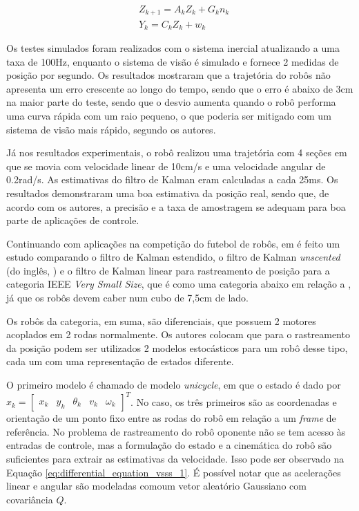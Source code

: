 \documentclass[acronym, symbols, table]{fei}
\begin{document}
	\begin{equation}\label{eq:kf_mult_rate}
		\begin{split}
			&Z_{k+1} = A_kZ_k + G_kn_k \\
			&Y_k = C_kZ_k + w_k
		\end{split}
	\end{equation}
	
	Os testes simulados foram realizados com o sistema inercial atualizando a uma taxa de 100Hz, enquanto o sistema de visão é simulado e fornece 2 medidas de posição por segundo. Os resultados mostraram que a trajetória do robôs não apresenta um erro crescente ao longo do tempo, sendo que o erro é abaixo de 3cm na maior parte do teste, sendo que o desvio aumenta quando o robô performa uma curva rápida com um raio pequeno, o que poderia ser mitigado com um sistema de visão mais rápido, segundo os autores.
	
	Já nos resultados experimentais, o robô realizou uma trajetória com 4 seções em que se movia com velocidade linear de 10cm/s e uma velocidade angular de 0.2rad/s. As estimativas do filtro de Kalman eram calculadas a cada 25ms. Os resultados demonstraram uma boa estimativa da posição real, sendo que, de acordo com os autores, a precisão e a taxa de amostragem se adequam para boa parte de aplicações de controle.
	
	Continuando com aplicações na competição do futebol de robôs, em \textcite{aguiar2017kalman} é feito um estudo comparando o filtro de Kalman estendido, o filtro de Kalman \textit{unscented} (do inglês, ) e o filtro de Kalman linear para rastreamento de posição para a categoria IEEE \textit{Very Small Size}, que é como uma categoria abaixo em relação a , já que os robôs devem caber num cubo de 7,5cm de lado.
	
	Os robôs da categoria, em suma, são diferenciais, que possuem 2 motores acoplados em 2 rodas normalmente. Os autores colocam que para o rastreamento da posição podem ser utilizados 2 modelos estocásticos para um robô desse tipo, cada um com uma representação de estados diferente. 
	
	O primeiro modelo é chamado de modelo \textit{unicycle}, em que o estado é dado por $x_k = \begin{bmatrix}
		x_k & y_k & \theta_k & v_k & \omega_k \end{bmatrix}^T$. No caso, os três primeiros são as coordenadas e orientação de um ponto fixo entre as rodas do robô em relação a um \textit{frame} de referência. No problema de rastreamento do robô oponente não se tem acesso às entradas de controle, mas a formulação do estado e a cinemática do robô são suficientes para extrair as estimativas da velocidade. Isso pode ser observado na Equação \ref{eq:differential_equation_vsss_1}. É possível notar que as acelerações linear e angular são modeladas comoum vetor aleatório Gaussiano com covariância $Q$.
		
\end{document}
